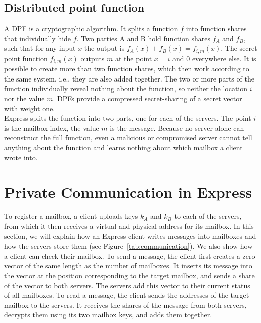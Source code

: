 \documentclass[a4paper]{article}
\begin{document}
\subsection{Distributed point function}
\label{subsec:DPF}
A DPF \citep{DPF2023} is a cryptographic algorithm. It splits a function $f$ into function shares that individually hide $f$. Two parties A and B hold function shares $f_A$ and $f_B$, such that for any input $x$ the output is $f_A(x) + f_B(x) = f_{i,m}(x)$. The secret point function $f_{i,m}(x)$ outputs $m$ at the point $x = i$ and $0$ everywhere else. It is possible to create more than two function shares, which then work according to the same system, i.e., they are also added together. The two or more parts of the function individually reveal nothing about the function, so neither the location $i$ nor the value $m$. DPFs provide a compressed secret-sharing of a secret vector with weight one. \\
Express splits the function into two parts, one for each of the servers. The point $i$ is the mailbox index, the value $m$ is the message. 
Because no server alone can reconstruct the full function, even a malicious or compromised server cannot tell anything about the function and learns nothing about which mailbox a client wrote into. 

\section{Private Communication in Express} %
\label{sec:private}
To register a mailbox, a client uploads keys $k_A$ and $k_B$ to each of the servers, from which  it then receives a virtual and physical address for its mailbox.
In this section, we will explain how an Express client writes messages into mailboxes and how the servers store them (see Figure~\ref{tab:communication}). We also show how a client can check their mailbox.
To send a message, the client first creates a zero vector of the same length as the number of mailboxes. It inserts its message into the vector at the position corresponding to the target mailbox, and sends a share of the vector to both servers. The servers add this vector to their current status of all mailboxes. 
To read a message, the client sends the addresses of the target mailbox to the servers. It receives the shares of the message from both servers, decrypts them using its two mailbox keys, and adds them together. 
\end{document}
